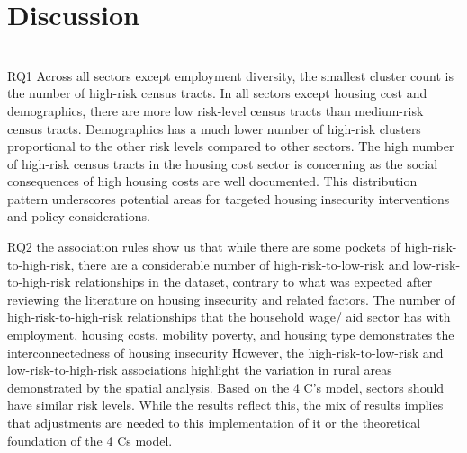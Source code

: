 \chapter{Discussion}	\\%

RQ1 Across all sectors except employment diversity, the smallest cluster count is the number of high-risk census tracts. In all sectors except housing cost and demographics, there are more low risk-level census tracts than medium-risk census tracts. Demographics has a much lower number of high-risk clusters proportional to the other risk levels compared to other sectors. The high number of high-risk census tracts in the housing cost sector is concerning as the social consequences of high housing costs are well documented. This distribution pattern underscores potential areas for targeted housing insecurity interventions and policy considerations. 

RQ2 the association rules show us that while there are some pockets of high-risk-to-high-risk, there are a considerable number of high-risk-to-low-risk and low-risk-to-high-risk relationships in the dataset, contrary to what was expected after reviewing the literature on housing insecurity and related factors. The number of high-risk-to-high-risk relationships that the household wage/ aid sector has with employment, housing costs, mobility poverty, and housing type demonstrates the interconnectedness of housing insecurity However, the high-risk-to-low-risk and low-risk-to-high-risk associations highlight the variation in rural areas demonstrated by the spatial analysis. Based on the 4 C’s model, sectors should have similar risk levels. While the results reflect this, the mix of results implies that adjustments are needed to this implementation of it or the theoretical foundation of the 4 Cs model.  

